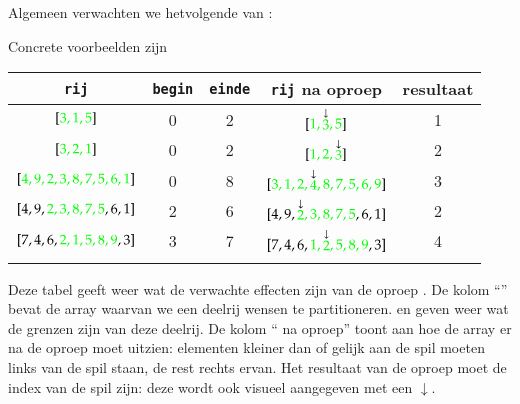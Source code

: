\begin{example} \label{example:sorteer:quicksort:partitioneer}
\newcommand{\HERE}{\ensuremath{\downarrow}}
Algemeen verwachten we hetvolgende van :
\begin{center}
\end{center}
Concrete voorbeelden zijn
\begin{center}
  \newcommand{\PIVOT}[1]{\stackrel{{\color{black}\HERE}}{#1}}
  \newcommand{\SUB}[1]{{\color{green}#1}}
  \begin{tabular}{ccccc}
    {\tt\bfseries rij} &
    {\tt\bfseries begin} &
    {\tt\bfseries einde} &
    {\tt\bfseries rij} na oproep &
    {\bf resultaat} \\
    \hline
    $[\SUB{3,1,5}]$ & 0 & 2 & $[\SUB{1,\PIVOT3,5}]$ & 1 \\{}
    $[\SUB{3,2,1}]$ & 0 & 2 & $[\SUB{1,2,\PIVOT3}]$ & 2 \\{}
    $[\SUB{4,9,2,3,8,7,5,6,1}]$ & 0 & 8 & $[\SUB{3,1,2,\PIVOT4,8,7,5,6,9}]$ & 3 \\{}
    $[4,9,\SUB{2,3,8,7,5},6,1]$ & 2 & 6 & $[4,9,\SUB{\PIVOT2,3,8,7,5},6,1]$ & 2 \\{}
    $[7,4,6,\SUB{2,1,5,8,9},3]$ & 3 & 7 & $[7,4,6,\SUB{1,\PIVOT2,5,8,9},3]$ & 4 \\{}
  \end{tabular}
\end{center}
Deze tabel geeft weer wat de verwachte effecten zijn van de oproep .
De kolom ``'' bevat de array waarvan we een deelrij wensen te partitioneren.
 en  geven weer wat de grenzen zijn van deze deelrij.
De kolom `` na oproep'' toont aan hoe de array er na de oproep moet uitzien:
elementen kleiner dan of gelijk aan de spil moeten links van de spil staan, de rest rechts ervan.
Het resultaat van de oproep moet de index van de spil zijn: deze wordt ook visueel aangegeven
met een $\HERE$.
\end{example}


